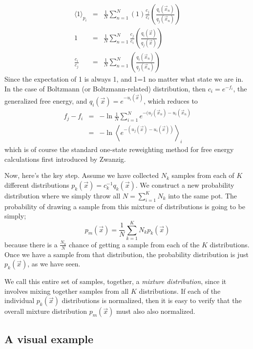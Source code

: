 \documentclass[aps,pre,twocolumn,superscriptaddress]{revtex4-1}
\newcommand{\expect}[1]{\left \langle #1 \right \rangle} %
\begin{document}
\begin{eqnarray}
\langle 1 \rangle_{p_i} &=& \frac{1}{N} \sum_{n=1}^{N} \left(1\right) \frac{c_j}{c_i} \left(\frac{q_i(\vec{x}_n)}{q_j(\vec{x}_n)}\right) \nonumber \\
        1  &=& \frac{1}{N} \sum_{n=1}^{N}\frac{c_j}{c_i} \left(\frac{q_i(\vec{x})}{q_j(\vec{x})}\right) \nonumber \\
       \frac{c_i}{c_j}  &=& \frac{1}{N} \sum_{n=1}^{N} \left(\frac{q_i(\vec{x}_n)}{q_j(\vec{x}_n)}\right)
\end{eqnarray}
Since the expectation of 1 is always 1, and 1=1 no matter what state
we are in. In the case of Boltzmann (or Boltzmann-related)
distribution, then $c_i = e^{-f_i}$, the generalized free energy, and
$q_i(\vec{x}) = e^{-u_i(\vec{x})}$, which reduces to
\begin{eqnarray}
f_j-f_i  &=& -\ln \frac{1}{N} \sum_{i=1}^N e^{-(u_j(\vec{x}_n)-u_i(\vec{x}_n)}  \nonumber \\
            &=& -\ln \expect{ e^{-(u_j(\vec{x})-u_i(\vec{x}))}}_{i}
\end{eqnarray}
which is of course the standard one-state reweighting method for free
energy calculations first introduced by Zwanzig.

Now, here's the key step.  Assume we have collected $N_k$ samples from
each of $K$ different distributions $p_k(\vec{x}) = c_k^{-1}
q_k(\vec{x})$. We construct a new probability distribution where we
simply throw all $N = \sum_{i=1}^K N_k$ into the same pot. The
probability of drawing a sample from this mixture of distributions is
going to be simply;
\begin{equation}
p_m(\vec{x}) = \frac{1}{N}\sum_{k=1}^K N_k p_k(\vec{x})
\end{equation}
because there is a $\frac{N_k}{N}$ chance of getting a sample from
each of the $K$ distributions. Once we have a sample from that
distribution, the probability distribution is just $p_k(\vec{x})$, as
we have seen.

We call this entire set of samples, together, a {\em mixture
  distribution}, since it involves mixing together samples from all
$K$ distributions.  If each of the individual $p_k(\vec{x})$
distributions is normalized, then it is easy to verify that the
overall mixture distribution $p_m(\vec{x})$ must also also normalized.

\subsection{A visual example}
\end{document}
